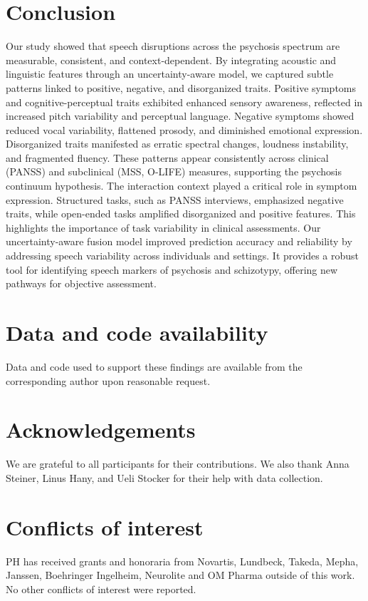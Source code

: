 \documentclass[9pt,a4paper]{rho-class/rho}
\begin{document}
\section{Conclusion}
Our study showed that speech disruptions across the psychosis spectrum are measurable, consistent, and context-dependent. By integrating acoustic and linguistic features through an uncertainty-aware model, we captured subtle patterns linked to positive, negative, and disorganized traits. Positive symptoms and cognitive-perceptual traits exhibited enhanced sensory awareness, reflected in increased pitch variability and perceptual language. Negative symptoms showed reduced vocal variability, flattened prosody, and diminished emotional expression. Disorganized traits manifested as erratic spectral changes, loudness instability, and fragmented fluency. These patterns appear consistently across clinical (PANSS) and subclinical (MSS, O-LIFE) measures, supporting the psychosis continuum hypothesis. The interaction context played a critical role in symptom expression. Structured tasks, such as PANSS interviews, emphasized negative traits, while open-ended tasks amplified disorganized and positive features. This highlights the importance of task variability in clinical assessments. Our uncertainty-aware fusion model improved prediction accuracy and reliability by addressing speech variability across individuals and settings. It provides a robust tool for identifying speech markers of psychosis and schizotypy, offering new pathways for objective assessment.         

\section*{Data and code availability}
Data and code used to support these findings are available from the corresponding author upon reasonable request.

\section*{Acknowledgements}
We are grateful to all participants for their contributions. We also thank Anna Steiner, Linus Hany, and Ueli Stocker for their help with data collection.

\section*{Conflicts of interest} PH has received grants and honoraria from Novartis, Lundbeck, Takeda, Mepha, Janssen, Boehringer Ingelheim, Neurolite and OM Pharma outside of this work. No other conflicts of interest were reported.
\end{document}
